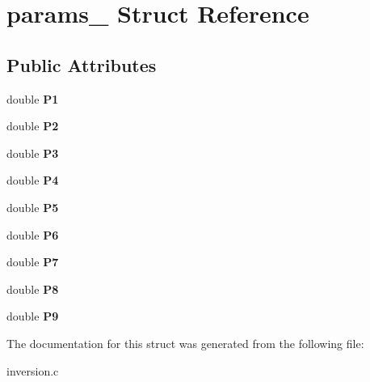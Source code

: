 \hypertarget{structparams__9}{}\section{params\+\_ Struct Reference}
\label{structparams__9}
\subsection*{Public Attributes}
\begin{DoxyCompactItemize}
\item 
\mbox{\label{structparams__9_afe666b0ba0ac555248f217b1409a7859}} 
double {\bfseries P1}
\item 
\mbox{\label{structparams__9_a6cf03ac9484c27b6ac70c505b9dd7ac9}} 
double {\bfseries P2}
\item 
\mbox{\label{structparams__9_ab9279f18324b05d83270fe9690b66d71}} 
double {\bfseries P3}
\item 
\mbox{\label{structparams__9_a49112a74a03fed7ba3c284747e9d5b0e}} 
double {\bfseries P4}
\item 
\mbox{\label{structparams__9_a48ebe9fe7fd0ba6bf8e16e4627d69c0b}} 
double {\bfseries P5}
\item 
\mbox{\label{structparams__9_ac9f6d18aa491e8c899b13308c5992348}} 
double {\bfseries P6}
\item 
\mbox{\label{structparams__9_a77f7f8a27c336d7843aac690d1730a21}} 
double {\bfseries P7}
\item 
\mbox{\label{structparams__9_a7e473d72fcb00a1b0c217e50c780a595}} 
double {\bfseries P8}
\item 
\mbox{\label{structparams__9_a322e862680ec30d763813cd06193d426}} 
double {\bfseries P9}
\end{DoxyCompactItemize}


The documentation for this struct was generated from the following file\+:\begin{DoxyCompactItemize}
\item 
inversion.\+c\end{DoxyCompactItemize}

